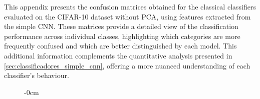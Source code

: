 \documentclass[journal,article,submit,pdftex,moreauthors]{Definitions/mdpi}
\begin{document}
This appendix presents the confusion matrices obtained for the classical classifiers evaluated on the CIFAR-10 dataset without PCA, using features extracted from the simple CNN. These matrices provide a detailed view of the classification performance across individual classes, highlighting which categories are more frequently confused and which are better distinguished by each model. This additional information complements the quantitative analysis presented in \autoref{sec:classificadores_simple_cnn}, offering a more nuanced understanding of each classifier’s behaviour.

\begin{figure}[H]
\begin{adjustwidth}{-\extralength}{0cm} %
\centering
{}\hfill
{}\\[1em]
\end{adjustwidth}
\end{figure}
\end{document}
